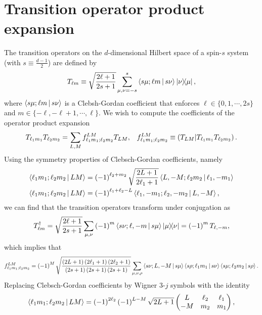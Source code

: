 \documentclass[notitlepage,twocolumn]{revtex4-2}
\newcommand{\f}[2]{\dfrac{#1}{#2}} %
\newcommand{\p}[1]{\left(#1\right)} %
\newcommand{\bk}{\Braket} %
\renewcommand{\set}[1]{\{#1\}} %
\def\obk#1{\mathinner{({#1})}}
\newcommand{\1}{\mathds{1}}
\begin{document}
\section{Transition operator product expansion}
\label{sec:trans_prod}

The transition operators on the $d$-dimensional Hilbert space of a spin-$s$ system (with $s\equiv\frac{d-1}{2}$) are defined by
\begin{align}
  T_{\ell m} \equiv \sqrt{\f{2\ell+1}{2s+1}} \sum_{\mu,\nu=-s}^s
  \bk{s\mu;\ell m|s\nu} \op{\nu}{\mu},
\end{align}
where $\bk{s\mu;\ell m|s\nu}$ is a Clebsh-Gordan coefficient that enforces $\ell\in\set{0,1,\cdots,2s}$ and $m\in\set{-\ell,-\ell+1,\cdots,\ell}$.
We wish to compute the coefficients of the operator product expansion
\begin{align}
  T_{\ell_1 m_1} T_{\ell_2 m_2}
  = \sum_{L,M} f_{\ell_1 m_1;\ell_2 m_2}^{LM} T_{LM},
  &&
  f_{\ell_1 m_1;\ell_2 m_2}^{LM}
  \equiv \obk{T_{LM} | T_{\ell_1 m_1} T_{\ell_2 m_2}}.
\end{align}
Using the symmetry properties of Clebsch-Gordan coefficients, namely
\begin{align}
  \bk{\ell_1 m_1; \ell_2 m_2| L M}
  &= \p{-1}^{\ell_2+m_2} \sqrt{\f{2L+1}{2\ell_1+1}}
  \bk{L,-M; \ell_2 m_2| \ell_1,-m_1} \\
  \bk{\ell_1 m_1; \ell_2 m_2| L M}
  &= \p{-1}^{\ell_1+\ell_2-L}
  \bk{\ell_1,-m_1; \ell_2,-m_2| L,-M},
\end{align}
we can find that the transition operators transform under conjugation as
\begin{align}
  T_{\ell m}^\dag
  = \sqrt{\f{2\ell+1}{2s+1}}
  \sum_{\mu,\nu} \p{-1}^m \bk{s\nu;\ell,-m|s\mu} \op{\mu}{\nu}
  = \p{-1}^m T_{\ell,-m},
\end{align}
which implies that
\begin{align}
  f_{\ell_1 m_1;\ell_2 m_2}^{LM}
  = \p{-1}^M \sqrt{\f{\p{2L+1}\p{2\ell_1+1}\p{2\ell_2+1}}
    {\p{2s+1}\p{2s+1}\p{2s+1}}}
  \sum_{\mu,\nu,\rho} \bk{s\nu;L,-M|s\mu}
  \bk{s\rho;\ell_1m_1|s\nu} \bk{s\mu;\ell_2m_2|s\rho}.
\end{align}
Replacing Clebsch-Gordan coefficients by Wigner 3-$j$ symbols with the identity
\begin{align}
  \bk{\ell_1 m_1; \ell_2 m_2| L M}
  = \p{-1}^{2\ell_2} \p{-1}^{L-M} \sqrt{2L+1}
  \begin{pmatrix}
    L & \ell_2 & \ell_1 \\
    -M & m_2 & m_1
  \end{pmatrix},
\end{align}
\end{document}
